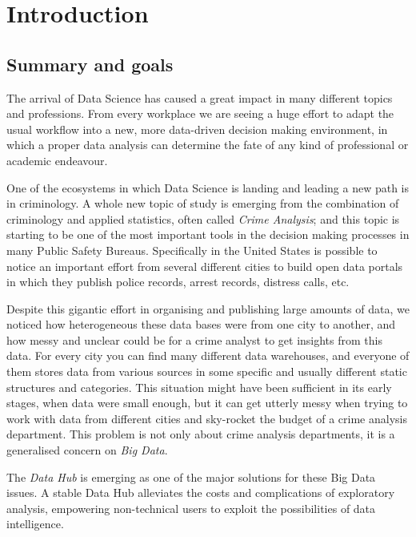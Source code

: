 \section{Introduction}
\subsection{Summary and goals}

The arrival of Data Science has caused a great impact in many different topics and professions. From every workplace we are seeing a huge effort to adapt the usual workflow into a new, more data-driven decision making environment, in which a proper data analysis can determine the fate of any kind of professional or academic endeavour.

One of the ecosystems in which Data Science is landing and leading a new path is in criminology. A whole new topic of study is emerging from the combination of criminology and applied statistics, often called \emph{Crime Analysis}; and this topic is starting to be one of the most important tools in the decision making processes in many Public Safety Bureaus. Specifically in the United States is possible to notice an important effort from several different cities to build open data portals in which they publish police records, arrest records, distress calls, etc.

Despite this gigantic effort in organising and publishing large amounts of data, we noticed how heterogeneous these data bases were from one city to another, and how messy and unclear could be for a crime analyst to get insights from this data. For every city you can find many different data warehouses, and everyone of them stores data from various sources in some specific and usually different static structures and categories. This situation might have been sufficient in its early stages, when data were small enough, but it can get utterly messy when trying to work with data from different cities and sky-rocket the budget of a crime analysis department. This problem is not only about crime analysis departments, it is a generalised concern on \emph{Big Data}.

The \emph{Data Hub} is emerging as one of the major solutions for these Big Data issues. A stable Data Hub alleviates the costs and complications of exploratory analysis, empowering non-technical users to exploit the possibilities of data intelligence.

